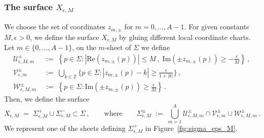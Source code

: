 \documentclass[12pt,reqno]{amsart}
\theoremstyle{definition}
\def\BZ{\mathbb Z}
\def\calW{\mathcal W}
\def\calV{\mathcal V}
\def\calU{\mathcal U}
\def\Re{\mathrm{Re}}
\def\Im{\mathrm{Im}}
\def\be{\begin{equation}}
\def\ee{\end{equation}}
\renewcommand{\=}{\;=\;}
\begin{document}
\subsubsection{The surface $X_{\epsilon,M}$}\label{sec:X_eps_M}
%
We choose the set of coordinates $z_{m,\pm}$ for $m=0,\ldots, A-1$. For given constants $M,\epsilon>0$, we define the surface $X_{\epsilon, M}$ by gluing different local coordinate charts. Let $m\in\{0,\dots,A-1\}$, on the $m$-sheet of $\Sigma$ we define 
\begin{align}
{\calU}_{\epsilon,M,m}^{\pm}&\;:=\;\left\lbrace p\in\Sigma\colon |\Re(z_{m,\pm}(p))|\leq M\,,\; \Im(\pm z_{m,\pm}(p))\geq-\frac{\epsilon}{M} \right\rbrace\,, \\
{\calV}_{\epsilon,m}^{\pm}&\;:=\;\bigcup_{k\in\BZ}\Big\{p\in\Sigma \colon |z_{m,\pm}(p)-k|\geq\frac{\epsilon}{1+|k|}\Big\}\,,\\
{\calW}_{\epsilon,M,m}^{\pm}&\;:=\;\left\lbrace p\in\Sigma\colon \Im(\pm z_{m,\pm}(p))\geq\frac{\epsilon}{M} \right\rbrace\,.
\end{align}
Then, we define the surface
\be
  X_{\epsilon, M}
  \=
  \Sigma_{\epsilon,M}^{+}\cup\Sigma_{\epsilon,M}^{-}\subset\Sigma\,,
  \qquad\text{where}\qquad 
  \Sigma_{\epsilon,M}^{\pm}
  \;:=\;\bigcup_{m=1}^A{\calU}_{\epsilon,M,m}^{\pm}\cap{\calV}_{\epsilon,m}^{\pm}\cup{\calW}_{\epsilon,M,m}^{\pm}\,.
\ee
We represent one of the sheets defining $\Sigma_{\epsilon,M}^{+}$ in Figure~\ref{fig:sigma_eps_M}.
\end{document}
